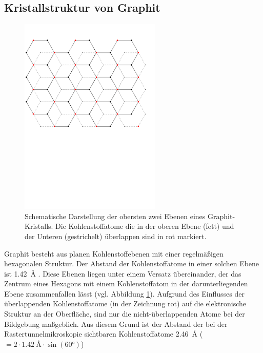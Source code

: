 \documentclass[10pt, a4paper]{article}
\begin{document}
\subsection{Kristallstruktur von Graphit}
\begin{figure}[h]
  \centering
  \includegraphics[width=0.6\textwidth]{grafiken/graphit.pdf}
  \caption{Schematische Darstellung der obersten zwei Ebenen eines Graphit-Kristalls. Die Kohlenstoffatome die in der oberen Ebene (fett) und der Unteren (gestrichelt) überlappen sind in rot markiert.}
  \label{fig:graphit}
\end{figure}
Graphit besteht aus planen Kohlenstoffebenen mit einer regelmäßigen hexagonalen Struktur.
Der Abstand der Kohlenstoffatome in einer solchen Ebene ist \SI{1,42}{\angstrom} \cite{colton}.
Diese Ebenen liegen unter einem Versatz übereinander, der das Zentrum eines Hexagons mit einem Kohlenstoffatom in der darunterliegenden Ebene zusammenfallen lässt (vgl. Abbildung \ref{fig:graphit}).
Aufgrund des Einflusses der überlappenden Kohlenstoffatome (in der Zeichnung rot) auf die elektronische Struktur an der Oberfläche, sind nur die nicht-überlappenden Atome bei der Bildgebung maßgeblich. Aus diesem Grund ist der Abstand der bei der Rastertunnelmikroskopie sichtbaren Kohlenstoffatome \SI{2,46}{\angstrom} ($=2 \cdot \SI{1,42}{\angstrom} \cdot \sin(60\si{\degree})$)
\end{document}
